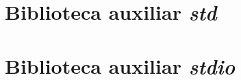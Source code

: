 \documentclass[12pt,oneside,a4paper,english]{abntex2}
\begin{document}
\begin{apendicesenv} %

	\partapendices
	
	\chapter{Biblioteca auxiliar \emph{std}}
	\label{app:std}
	
	
	
	\chapter{Biblioteca auxiliar \emph{stdio}}
	\label{app:stdio}
	
	

\end{apendicesenv}
\end{document}
